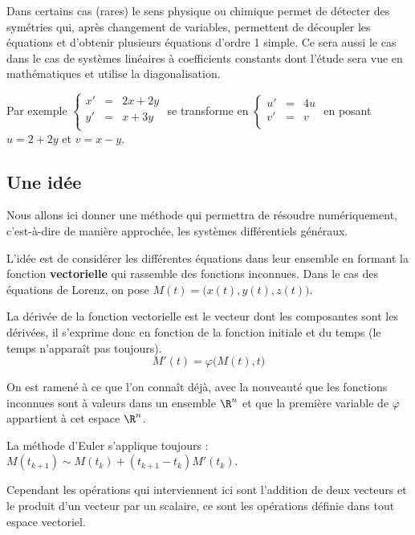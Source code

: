 Dans certains cas (rares) le sens physique ou chimique permet de détecter des symétries qui, après changement de variables, permettent de découpler les équations et d'obtenir plusieurs équations d'ordre 1 simple. Ce sera aussi le cas dans le cas de systèmes linéaires à coefficients constants dont l'étude sera vue en mathématiques et utilise la diagonalisation.

Par exemple $\left\{\begin{matrix}x'&=&2x + 2y\\ y' &=& x + 3 y\\ \end{matrix}\right.$ se transforme en
$\left\{\begin{matrix}u'&=&4u\\ v' &=& v\\ \end{matrix}\right.$ en posant $u = 2+2y$ et $v =x-y$.
\subsection{Une idée}
Nous allons ici donner une méthode qui permettra de résoudre numériquement, c'est-à-dire de manière approchée, les systèmes différentiels généraux. 

L'idée est de considérer les différentes équations dans leur ensemble en formant la fonction {\bf vectorielle} qui rassemble des fonctions inconnues. Dans le cas des équations de Lorenz, on pose $M(t) = \bigl(x(t), y(t), z(t)\bigr)$.

La dérivée de la fonction vectorielle est le vecteur dont les composantes sont les dérivées, il s'exprime donc en fonction de la fonction initiale et du temps (le temps n'apparaît pas toujours).
\[M'(t) = \varphi\bigl(M(t), t\bigr)\]

On est ramené à ce que l'on connaît déjà, avec la nouveauté que les fonctions inconnues sont à valeurs dans un ensemble $\R^n$ et que la première variable de $\varphi$ appartient à cet espace $\R^n$.

\medskip

La méthode d'Euler s'applique toujours : $M(t_{k+1})\sim M(t_k) + (t_{k+1} - t_k) M'(t_k)$.

Cependant les opérations qui interviennent ici sont l'addition de deux vecteurs et le produit d'un vecteur par un scalaire, ce sont les opérations définie dans tout espace vectoriel.
